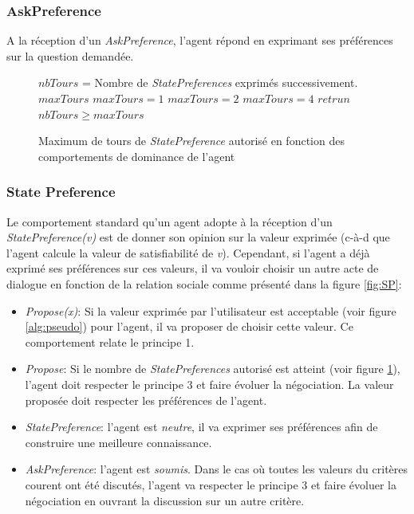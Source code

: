 	\subsubsection{AskPreference}
	A la réception d'un \emph{AskPreference}, l'agent répond en exprimant ses préférences sur la question demandée.
	

		 
		 \begin{figure}[t]
		 	\caption{\label{alg:maxtours} Maximum de tours de \emph{StatePreference} autorisé en fonction des comportements de dominance de l'agent}
		 	\begin{algorithmic}[1]
		 		\State $nbTours$ = Nombre de \emph{StatePreferences} exprimés successivement.
		 		\State $maxTours$ 
		 		\State $maxTours = 1$
		 		\EndIf
		 		 \State $maxTours = 2$
		 		\EndIf
		 		\State $maxTours = 4$
		 		\EndIf
		 		\State $retrun$ $nbTours\geq maxTours$
		 		\EndFunction
		 	\end{algorithmic}
		 \end{figure} 
		 
	\subsubsection{State Preference}
	Le comportement standard qu'un agent adopte à la réception d'un \emph{StatePreference(v)} est de donner son opinion sur la valeur exprimée (c-à-d que l'agent calcule la valeur de satisfiabilité de \textit{v}). Cependant, si l'agent a déjà exprimé ses préférences sur ces valeurs, il va vouloir choisir un autre acte de dialogue en fonction de la relation sociale comme présenté dans la figure \ref{fig:SP}:
	\begin{itemize}
		\item \emph{Propose(x)}: Si la valeur exprimée par l'utilisateur est acceptable (voir figure \ref{alg:pseudo}) pour l'agent, il va proposer de choisir cette valeur. Ce comportement relate le principe 1.
		\item \emph{Propose}: Si le nombre de \emph{StatePreferences} autorisé est atteint (voir figure \ref{alg:maxtours}), l'agent doit respecter le principe 3 et faire évoluer la négociation. La valeur proposée doit respecter les préférences de l'agent. 
		\item \emph{StatePreference}: l'agent est \emph{neutre}, il va exprimer ses préférences afin de construire une meilleure connaissance.
		\item \emph{AskPreference}: l'agent est \emph{soumis}. Dans le cas où toutes les valeurs du critères courent ont été discutés, l'agent va respecter le principe 3 et faire évoluer la négociation en ouvrant la discussion sur un autre critère.
	\end{itemize}
	
